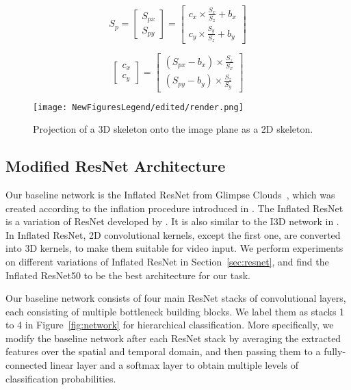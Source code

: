 \documentclass{article}
\begin{document}
\begin{equation} 
\label{projection}
S_p = \begin{bmatrix}
S_{px}\\
S_{py}
\end{bmatrix} =
\begin{bmatrix}
c_x \times\frac{S_x}{S_z} + b_x \\
c_y \times\frac{S_y}{S_z} + b_y
\end{bmatrix}
\end{equation}
 
\begin{equation} 
\label{calculation}
\begin{bmatrix}
c_x\\
c_y
\end{bmatrix} =
\begin{bmatrix}
(S_{px} - b_x)  \times \frac{S_z}{S_x} \\
(S_{py} - b_y)  \times \frac{S_z}{S_y}
\end{bmatrix}
\end{equation}
 

\begin{figure}[tb]
\centering
\texttt{[image: NewFiguresLegend/edited/render.png]}
\caption{Projection of a 3D skeleton onto the image plane as a 2D skeleton.}
\label{fig:projection}
\end{figure}

\subsection{Modified ResNet Architecture}
\label{sec:network}

{Our baseline network is the Inflated ResNet from Glimpse Clouds~\cite{Baradel_2018}, which was created according to the inflation procedure introduced in \cite{carreira2017quo}. The Inflated ResNet is a variation of ResNet developed by \cite{He_2016}. It is also similar to the I3D network in \cite{zhu2018action}. In Inflated ResNet, 2D convolutional kernels, except the first one, are converted into 3D kernels, to make them suitable for video input. We perform experiments on different variations of Inflated ResNet in Section~\ref{sec:resnet}, and find the Inflated ResNet50 to be the best architecture for our task.} 





{Our baseline network consists of four main ResNet stacks of convolutional layers, each consisting of multiple bottleneck building blocks. We label them as stacks 1 to 4 in Figure~\ref{fig:network} for hierarchical classification. More specifically, we modify the baseline network after each ResNet stack by averaging the extracted features over the spatial and temporal domain, and then passing them to a fully-connected linear layer and a softmax layer to obtain multiple levels of classification probabilities.} 
\end{document}
